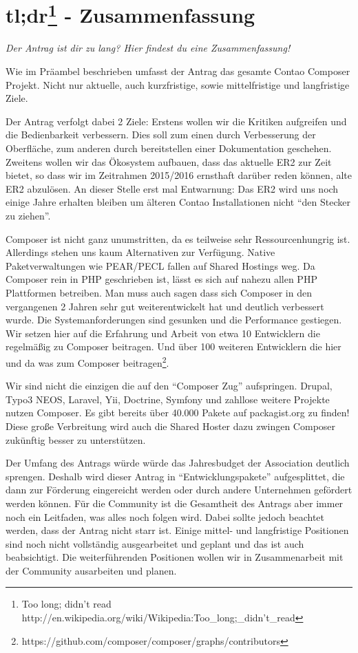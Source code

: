 \documentclass[
paper=a4,
draft=false,%
fontsize=10pt%
]{scrartcl}
\begin{document}
\section{tl;dr\footnote{Too long; didn’t read\\
http://en.wikipedia.org/wiki/Wikipedia:Too\_long;\_didn't\_read} - Zusammenfassung}

\textit{Der Antrag ist dir zu lang? Hier findest du eine Zusammenfassung!}

Wie im Präambel beschrieben umfasst der Antrag das gesamte Contao Composer Projekt. Nicht nur aktuelle, auch kurzfristige, sowie mittelfristige und langfristige Ziele.

Der Antrag verfolgt dabei 2 Ziele:
Erstens wollen wir die Kritiken aufgreifen und die Bedienbarkeit verbessern. Dies soll zum einen durch Verbesserung der Oberfläche, zum anderen durch bereitstellen einer Dokumentation geschehen.
Zweitens wollen wir das Ökosystem aufbauen, dass das aktuelle ER2 zur Zeit bietet, so dass wir im Zeitrahmen 2015/2016 ernsthaft darüber reden können, alte ER2 abzulösen. An dieser Stelle erst mal Entwarnung: Das ER2 wird uns noch einige Jahre erhalten bleiben um älteren Contao Installationen nicht “den Stecker zu ziehen”.

Composer ist nicht ganz unumstritten, da es teilweise sehr Ressourcenhungrig ist. Allerdings stehen uns kaum Alternativen zur Verfügung. Native Paketverwaltungen wie PEAR/PECL fallen auf Shared Hostings weg. Da Composer rein in PHP geschrieben ist, lässt es sich auf nahezu allen PHP Plattformen betreiben. Man muss auch sagen dass sich Composer in den vergangenen 2 Jahren sehr gut weiterentwickelt hat und deutlich verbessert wurde. Die Systemanforderungen sind gesunken und die Performance gestiegen. Wir setzen hier auf die Erfahrung und Arbeit von etwa 10 Entwicklern die regelmäßig zu Composer beitragen. Und über 100 weiteren Entwicklern die hier und da was zum Composer beitragen\footnote{https://github.com/composer/composer/graphs/contributors}.

Wir sind nicht die einzigen die auf den “Composer Zug” aufspringen. Drupal, Typo3 NEOS, Laravel, Yii, Doctrine, Symfony und zahllose weitere Projekte nutzen Composer. Es gibt bereits über 40.000 Pakete auf packagist.org zu finden! Diese große Verbreitung wird auch die Shared Hoster dazu zwingen Composer zukünftig besser zu unterstützen.

Der Umfang des Antrags würde würde das Jahresbudget der Association deutlich sprengen. Deshalb wird dieser Antrag in “Entwicklungspakete” aufgesplittet, die dann zur Förderung eingereicht werden oder durch andere Unternehmen gefördert werden können.
Für die Community ist die Gesamtheit des Antrags aber immer noch ein Leitfaden, was alles noch folgen wird.
Dabei sollte jedoch beachtet werden, dass der Antrag nicht starr ist. Einige mittel- und langfristige Positionen sind noch nicht vollständig ausgearbeitet und geplant und das ist auch beabsichtigt. Die weiterführenden Positionen wollen wir in Zusammenarbeit mit der Community ausarbeiten und planen.
\end{document}
